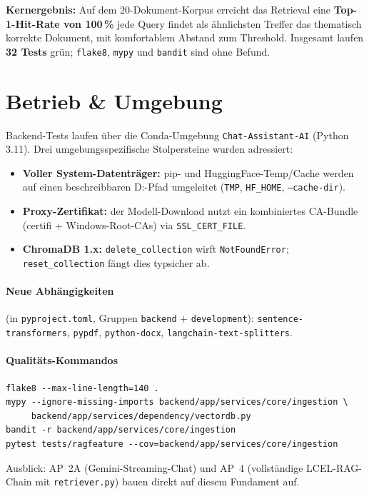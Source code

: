 \documentclass[11pt,a4paper]{article}
\begin{document}
\vspace{4mm}
\noindent\textbf{Kernergebnis:} Auf dem 20-Dokument-Korpus erreicht das Retrieval eine
\textbf{Top-1-Hit-Rate von 100\,\%} \textendash{} jede Query findet als ähnlichsten
Treffer das thematisch korrekte Dokument, mit komfortablem Abstand zum Threshold.
Insgesamt laufen \textbf{32 Tests} grün; \texttt{flake8}, \texttt{mypy} und
\texttt{bandit} sind ohne Befund.

\section{Betrieb \& Umgebung}
Backend-Tests laufen über die Conda-Umgebung \texttt{Chat-Assistant-AI} (Python 3.11).
Drei umgebungsspezifische Stolpersteine wurden adressiert:

\begin{itemize}[leftmargin=1.4em]
  \item \textbf{Voller System-Datenträger:} pip- und HuggingFace-Temp/Cache werden auf
        einen beschreibbaren D:-Pfad umgeleitet (\texttt{TMP}, \texttt{HF\_HOME},
        \texttt{--cache-dir}).
  \item \textbf{Proxy-Zertifikat:} der Modell-Download nutzt ein kombiniertes
        CA-Bundle (certifi + Windows-Root-CAs) via \texttt{SSL\_CERT\_FILE}.
  \item \textbf{ChromaDB 1.x:} \texttt{delete\_collection} wirft \texttt{NotFoundError};
        \texttt{reset\_collection} fängt dies typsicher ab.
\end{itemize}

\paragraph{Neue Abhängigkeiten} (in \texttt{pyproject.toml}, Gruppen \texttt{backend} +
\texttt{development}): \texttt{sentence-transformers}, \texttt{pypdf},
\texttt{python-docx}, \texttt{langchain-text-splitters}.

\paragraph{Qualitäts-Kommandos}
\begin{lstlisting}[style=py,numbers=none]
flake8 --max-line-length=140 .
mypy --ignore-missing-imports backend/app/services/core/ingestion \
     backend/app/services/dependency/vectordb.py
bandit -r backend/app/services/core/ingestion
pytest tests/ragfeature --cov=backend/app/services/core/ingestion
\end{lstlisting}

\vfill
\begin{center}\small\color{codecom}
Ausblick: AP~2A (Gemini-Streaming-Chat) und AP~4 (vollständige LCEL-RAG-Chain mit
\texttt{retriever.py}) bauen direkt auf diesem Fundament auf.
\end{center}
\end{document}
